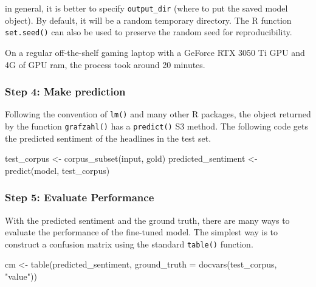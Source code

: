 \documentclass[
]{ccr}
\newenvironment{Shaded}{\begin{snugshade}}{\end{snugshade}}
\newcommand{\AttributeTok}[1]{\textcolor[rgb]{0.40,0.45,0.13}{#1}}
\newcommand{\FunctionTok}[1]{\textcolor[rgb]{0.28,0.35,0.67}{#1}}
\newcommand{\NormalTok}[1]{\textcolor[rgb]{0.00,0.23,0.31}{#1}}
\newcommand{\OtherTok}[1]{\textcolor[rgb]{0.00,0.23,0.31}{#1}}
\newcommand{\StringTok}[1]{\textcolor[rgb]{0.13,0.47,0.30}{#1}}
\begin{document}
in general, it is better to specify \texttt{output\_dir} (where to put
the saved model object). By default, it will be a random temporary
directory. The R function \texttt{set.seed()} can also be used to
preserve the random seed for reproducibility.

On a regular off-the-shelf gaming laptop with a GeForce RTX 3050 Ti GPU
and 4G of GPU ram, the process took around 20 minutes.

\hypertarget{step-4-make-prediction}{%
\subsubsection{Step 4: Make prediction}\label{step-4-make-prediction}}

Following the convention of \texttt{lm()} and many other R packages, the
object returned by the function \texttt{grafzahl()} has a
\texttt{predict()} S3 method. The following code gets the predicted
sentiment of the headlines in the test set.

\begin{Shaded}
\begin{Highlighting}[]
\NormalTok{test\_corpus }\OtherTok{\textless{}{-}} \FunctionTok{corpus\_subset}\NormalTok{(input, gold)}
\NormalTok{predicted\_sentiment }\OtherTok{\textless{}{-}} \FunctionTok{predict}\NormalTok{(model, test\_corpus)}
\end{Highlighting}
\end{Shaded}

\hypertarget{step-5-evaluate-performance}{%
\subsubsection{Step 5: Evaluate
Performance}\label{step-5-evaluate-performance}}

With the predicted sentiment and the ground truth, there are many ways
to evaluate the performance of the fine-tuned model. The simplest way is
to construct a confusion matrix using the standard \texttt{table()}
function.

\begin{Shaded}
\begin{Highlighting}[]
\NormalTok{cm }\OtherTok{\textless{}{-}} \FunctionTok{table}\NormalTok{(predicted\_sentiment,}
            \AttributeTok{ground\_truth =} \FunctionTok{docvars}\NormalTok{(test\_corpus, }\StringTok{"value"}\NormalTok{))}
\end{Highlighting}
\end{Shaded}
\end{document}
